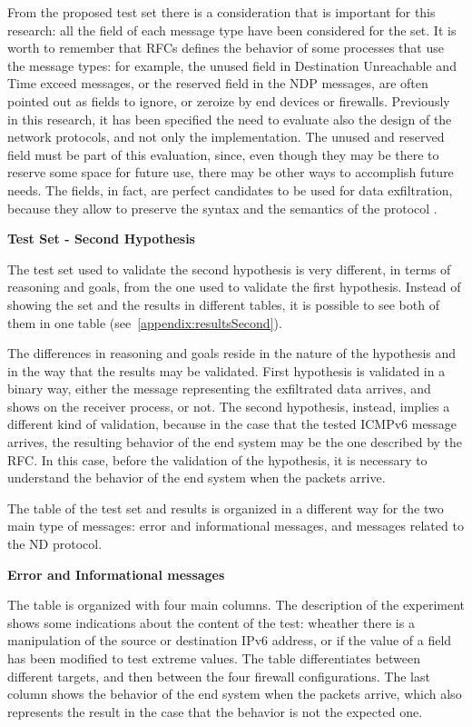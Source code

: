 \documentclass[12pt]{article}
\begin{document}
From the proposed test set there is a consideration that is important for this research: all the field of each message type have been considered for the set. It is worth to remember that RFCs defines the behavior of some processes that use the message types: for example, the unused field in Destination Unreachable and Time exceed messages, or the reserved field in the NDP messages, are often pointed out as fields to ignore, or zeroize by end devices or firewalls. Previously in this research, it has been specified the need to evaluate also the design of the network protocols, and not only the implementation. The unused and reserved field must be part of this evaluation, since, even though they may be there to reserve some space for future use, there may be other ways to accomplish future needs. The fields, in fact, are perfect candidates to be used for data exfiltration, because they allow to preserve the syntax and the semantics of the protocol \cite{lewandowski}.

\textbf{Test Set - Second Hypothesis}

The test set used to validate the second hypothesis is very different, in terms of reasoning and goals, from the one used to validate the first hypothesis. Instead of showing the set and the results in different tables, it is possible to see both of them in one table (see~\ref{appendix:resultsSecond}).

The differences in reasoning and goals reside in the nature of the hypothesis and in the way that the results may be validated. First hypothesis is validated in a binary way, either the message representing the exfiltrated data arrives, and shows on the receiver process, or not. The second hypothesis, instead, implies a different kind of validation, because in the case that the tested ICMPv6 message arrives, the resulting behavior of the end system may be the one described by the RFC. In this case, before the validation of the hypothesis, it is necessary to understand the behavior of the end system when the packets arrive.

The table of the test set and results is organized in a different way for the two main type of messages: error and informational messages, and messages related to the ND protocol.

\textbf{Error and Informational messages}

The table is organized with four main columns. The description of the experiment shows some indications about the content of the test: wheather there is a manipulation of the source or destination IPv6 address, or if the value of a field has been modified to test extreme values. The table differentiates between different targets, and then between the four firewall configurations. The last column shows the behavior of the end system when the packets arrive, which also represents the result in the case that the behavior is not the expected one.
\end{document}
